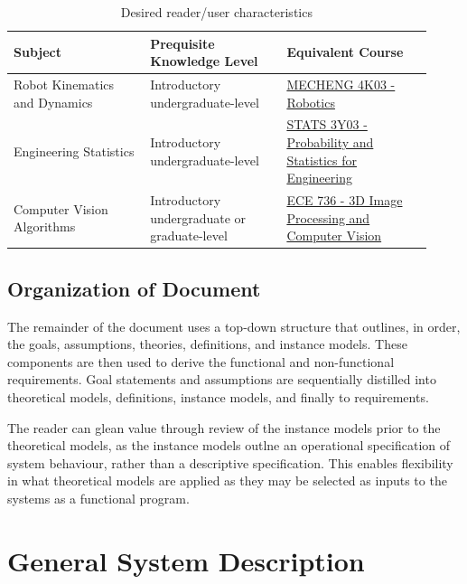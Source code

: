 \documentclass[12pt]{article}
\begin{document}
\begin{table}[h!]
  \begin{tabular}{|p{0.3\linewidth}|p{0.3\linewidth}|p{0.32\linewidth}|}
  \hline 
  Subject                       & Prequisite Knowledge Level                   & Equivalent Course                                                                                                                                                            \\ \hline
  Robot Kinematics and Dynamics & Introductory undergraduate-level             & \href{https://academiccalendars.romcmaster.ca/preview\_course\_nopop.php?catoid=53\&coid=265836}{MECHENG 4K03 - Robotics}                                 \\ \hline
  Engineering Statistics        & Introductory undergraduate-level             & \href{https://academiccalendars.romcmaster.ca/preview\_course\_nopop.php?catoid=53\&coid=265836}{STATS 3Y03 - Probability and Statistics for Engineering} \\ \hline
  Computer Vision Algorithms    & Introductory undergraduate or graduate-level & \href{https://academiccalendars.romcmaster.ca/preview\_course\_nopop.php?catoid=53\&coid=265836}{ECE 736 - 3D Image Processing and Computer Vision}       \\ \hline
  \end{tabular}
  \caption{Desired reader/user characteristics}
  \label{Table_UserChar}
  \end{table}

\subsection{Organization of Document}
The remainder of the document uses a top-down structure that outlines, in order, 
the goals, assumptions, theories, definitions, and instance models. These 
components are then used to derive the functional and non-functional requirements. 
Goal statements and assumptions are sequentially distilled into theoretical models, 
definitions, instance models, and finally to requirements.

The reader can glean value through review of the instance models prior to 
the theoretical models, as the instance models outlne an operational specification of 
system behaviour, rather than a descriptive specification. This enables flexibility 
in what theoretical models are applied as they may be selected as inputs to the 
systems as a functional program. 

\section{General System Description}
\end{document}
